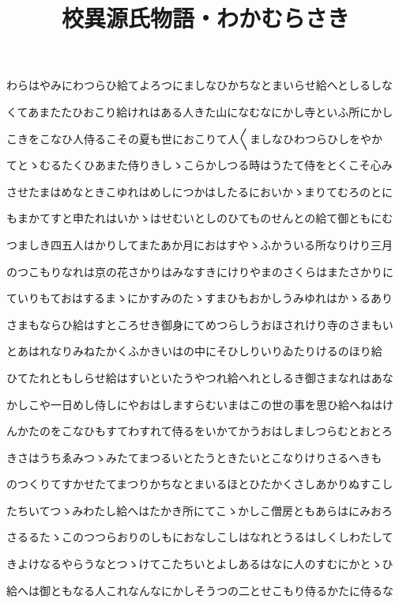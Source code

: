 \documentclass[a4paper,11pt,landscape]{ltjtarticle}
\title{校異源氏物語・わかむらさき}
\date{}
\begin{document}
\maketitle

わらはやみにわつらひ給てよろつにましなひかちなとまいらせ給へとしるしな
\par\medskip
くてあまたたひおこり給けれはある人きた山になむなにかし寺といふ所にかし
\par\medskip
こきをこなひ人侍るこその夏も世におこりて人〱ましなひわつらひしをやか
\par\medskip
てとゝむるたくひあまた侍りきしゝこらかしつる時はうたて侍をとくこそ心み
\par\medskip
させたまはめなときこゆれはめしにつかはしたるにおいかゝまりてむろのとに
\par\medskip
もまかてすと申たれはいかゝはせむいとしのひてものせんとの給て御ともにむ
\par\medskip
つましき四五人はかりしてまたあか月におはすやゝふかういる所なりけり三月
\par\medskip
のつこもりなれは京の花さかりはみなすきにけりやまのさくらはまたさかりに
\par\medskip
ていりもておはするまゝにかすみのたゝすまひもおかしうみゆれはかゝるあり
\par\medskip
さまもならひ給はすところせき御身にてめつらしうおほされけり寺のさまもい
\par\medskip
とあはれなりみねたかくふかきいはの中にそひしりいりゐたりけるのほり給
\par\medskip
ひてたれともしらせ給はすいといたうやつれ給へれとしるき御さまなれはあな
\par\medskip
かしこや一日めし侍しにやおはしますらむいまはこの世の事を思ひ給へねはけ
\par\medskip
んかたのをこなひもすてわすれて侍るをいかてかうおはしましつらむとおとろ
\par\medskip
きさはうちゑみつゝみたてまつるいとたうときたいとこなりけりさるへきも
\par\medskip
のつくりてすかせたてまつりかちなとまいるほとひたかくさしあかりぬすこし
\par\medskip
たちいてつゝみわたし給へはたかき所にてこゝかしこ僧房ともあらはにみおろ
\par\medskip
さるるたゝこのつつらおりのしもにおなしこしはなれとうるはしくしわたして
\par\medskip
きよけなるやらうなとつゝけてこたちいとよしあるはなに人のすむにかとゝひ
\par\medskip
給へは御ともなる人これなんなにかしそうつの二とせこもり侍るかたに侍るな
\end{document}
